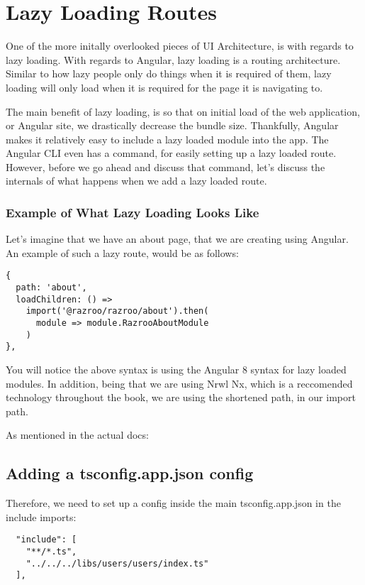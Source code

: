 
\chapter{ Lazy Loading Routes }
One of the more initally overlooked pieces of UI Architecture, is with regards to 
lazy loading. With regards to Angular, lazy loading is a routing architecture.
Similar to how lazy people only do things when it is required of them, lazy loading 
will only load when it is required for the page it is navigating to. 

The main benefit of lazy loading, is so that on initial load of the web application, 
or Angular site, we drastically decrease the bundle size. Thankfully, Angular 
makes it relatively easy to include a lazy loaded module into the app. The Angular CLI 
even has a command, for easily setting up a lazy loaded route. However, before we go 
ahead and discuss that command, let's discuss the internals of what happens when we
add a lazy loaded route. 

\subsection{Example of What Lazy Loading Looks Like}
Let's imagine that we have an about page, that we are creating using Angular.
An example of such a lazy route, would be as follows:
\begin{lstlisting}
{
  path: 'about',
  loadChildren: () =>
    import('@razroo/razroo/about').then(
      module => module.RazrooAboutModule
    )
},
\end{lstlisting}

You will notice the above syntax is using the Angular 8 syntax for lazy loaded
modules. In addition, being that we are using Nrwl Nx, which is a reccomended 
technology throughout the book, we are using the shortened path, in our import 
path. 

As mentioned in the actual docs:

\section{Adding a tsconfig.app.json config}
Therefore, we need to set up a config inside the main tsconfig.app.json in the
include imports:
\begin{verbatim}
  "include": [
    "**/*.ts",
    "../../../libs/users/users/index.ts"
  ],
\end{verbatim}

